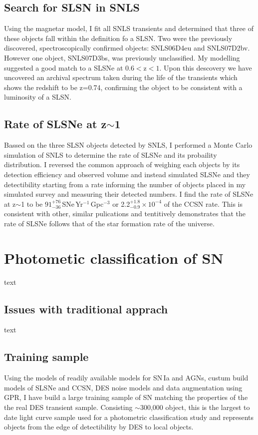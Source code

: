 \subsection{Search for SLSN in SNLS}
Using the magnetar model, I fit all SNLS transients and determined that three of these objects fall within the definition fo a SLSN. Two were the previously discovered, spectroscopically confirmed objects: SNLS06D4eu and SNLS07D2bv. However one object, SNLS07D3bs, was previously unclassified. My modelling suggested a good match to a SLSNe at 0.6$<$z$<1$. Upon this descovery we have uncovered an archival spectrum taken during the life of the transients which shows the redshift to be z=0.74, confirming the object to be consistent with a luminosity of a SLSN.

\subsection{Rate of SLSNe at z$\sim$1}
Bassed on the three SLSN objects detected by SNLS, I performed a Monte Carlo simulation of SNLS to determine the rate of SLSNe and its probaility distribution. I reversed the common approach of weighing each objects by its detection efficiency and observed volume and instead simulated SLSNe and they detectibility starting from a rate informing the number of objects placed in my simulated survey and measuring their detected numbers. I find the rate of SLSNe at z$\sim$1 to be $91^{+76}_{-36}$\,SNe\,Yr$^{-1}$\,Gpc$^{-3}$ or 2.2$^{+1.8}_{-0.9}\times10^{-4}$ of the CCSN rate. This is consistent with other, similar pulications and tentitively demonstrates that the rate of SLSNe follows that of the star formation rate of the universe.

\section{Photometic classification of SN}
text

\subsection{Issues with traditional apprach}
text

\subsection{Training sample}
Using the models of readily available models for SN\,Ia and AGNs, custum build models of SLSNe and CCSN, DES noise models and data augmentation using GPR, I have build a large training sample of SN matching the properties of the the real DES transient sample. Consisting $\sim$300,000 object, this is the largest to date light curve sample used for a photometric classification study and represents objects from the edge of detectibility by DES to local objects.


